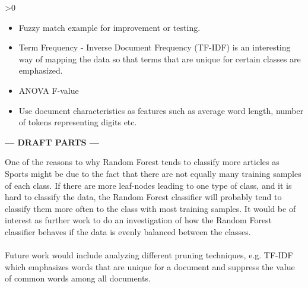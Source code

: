 \ifnum\printdraft>0
	\begin{itemize}
		\item Fuzzy match example for improvement or testing.
		\item Term Frequency - Inverse Document Frequency (TF-IDF) is an interesting way of mapping the data so that terms that are unique for certain classes are emphasized.
		\item ANOVA F-value
		\item Use document characteristics as features such as average word length, number of tokens representing digits etc.
	\end{itemize}
\else
\begin{center}
	\textbf{--- DRAFT PARTS ---}
\end{center}
\fi

One of the reasons to why Random Forest tends to classify more articles as Sports might be due to the fact that there are not equally many training samples of each class. If there are more leaf-nodes leading to one type of class, and it is hard to classify the data, the Random Forest classifier will probably tend to classify them more often to the class with most training samples. It would be of interest as further work to do an investigation of how the Random Forest classifier behaves if the data is evenly balanced between the classes.\\\\
Future work would include analyzing different pruning techniques, e.g. TF-IDF which emphasizes words that are unique for a document and suppress the value of common words among all documents. 
